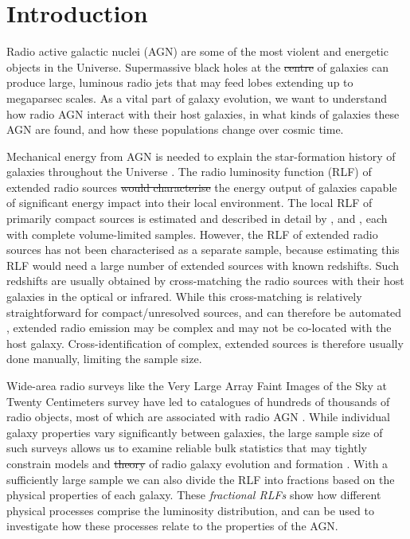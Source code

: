 \documentclass[11pt, a4paper]{book}
\newcommand{\defn}[1]{\emph{#1}}
\providecommand{\DIFaddtex}[1]{{\protect\color{blue}\uwave{#1}}} %
\providecommand{\DIFdeltex}[1]{{\protect\color{red}\sout{#1}}}                      %
\providecommand{\DIFaddbegin}{} %
\providecommand{\DIFaddend}{} %
\providecommand{\DIFdelbegin}{} %
\providecommand{\DIFdelend}{} %
\providecommand{\DIFadd}[1]{\texorpdfstring{\DIFaddtex{#1}}{#1}} %
\providecommand{\DIFdel}[1]{\texorpdfstring{\DIFdeltex{#1}}{}} %
\newcommand{\DIFscaledelfig}{0.5}
\newlength{\DIFdelgraphicswidth} %
\newlength{\DIFdelgraphicsheight} %
\newcommand{\DIFaddincludegraphics}[2][]{{\color{blue}\fbox{\DIFOincludegraphics[#1]{#2}}}} %
\newcommand{\DIFdelincludegraphics}[2][]{%
\sbox{\DIFdelgraphicsbox}{\DIFOincludegraphics[#1]{#2}}%
\settoboxwidth{\DIFdelgraphicswidth}{\DIFdelgraphicsbox} %
\settoboxtotalheight{\DIFdelgraphicsheight}{\DIFdelgraphicsbox} %
\scalebox{\DIFscaledelfig}{%
\parbox[b]{\DIFdelgraphicswidth}{\usebox{\DIFdelgraphicsbox}\\[-\baselineskip] \rule{\DIFdelgraphicswidth}{0em}}\llap{\resizebox{\DIFdelgraphicswidth}{\DIFdelgraphicsheight}{%
\setlength{\unitlength}{\DIFdelgraphicswidth}%
\begin{picture}(1,1)%
\thicklines\linethickness{2pt} %
{\color[rgb]{1,0,0}\put(0,0){\framebox(1,1){}}}%
{\color[rgb]{1,0,0}\put(0,0){\line( 1,1){1}}}%
{\color[rgb]{1,0,0}\put(0,1){\line(1,-1){1}}}%
\end{picture}%
}\hspace*{3pt}}} %
} %
\DeclareRobustCommand{\DIFaddbegin}{\DIFOaddbegin \let\includegraphics\DIFaddincludegraphics} %
\DeclareRobustCommand{\DIFaddend}{\DIFOaddend \let\includegraphics\DIFOincludegraphics} %
\DeclareRobustCommand{\DIFdelbegin}{\DIFOdelbegin \let\includegraphics\DIFdelincludegraphics} %
\DeclareRobustCommand{\DIFdelend}{\DIFOaddend \let\includegraphics\DIFOincludegraphics} %
\begin{document}
\section{Introduction} \label{sec:rlfs-intro}

Radio active galactic nuclei (AGN) are some of the most violent and energetic
objects in the Universe. Supermassive black holes at the \DIFdelbegin \DIFdel{centre }\DIFdelend \DIFaddbegin \DIFadd{centres }\DIFaddend of galaxies
can produce large, luminous radio jets that may feed lobes extending up to
megaparsec scales. As a vital part of galaxy evolution, we want to understand
how radio AGN interact with their host galaxies, in what kinds of galaxies
these AGN are found, and how these populations change over cosmic time.

Mechanical energy from AGN is needed to explain the star-formation history of galaxies throughout the Universe \citep[e.g.][]{raouf17agn,hardcastle20feedback}. The radio luminosity function (RLF) of extended radio sources \DIFdelbegin \DIFdel{would characterise }\DIFdelend \DIFaddbegin \DIFadd{characterises }\DIFaddend the energy output of galaxies capable of significant energy impact into their local environment. The local RLF of primarily compact sources is estimated and
described in detail by \citet{mauch07rlf}, \citet{pracy16rlf} and
\citet{condon19rlf}, each with complete volume-limited samples. However, the RLF of extended radio sources has not been
characterised as a separate sample, because estimating this RLF would need a large number of extended sources with known
redshifts. Such redshifts are usually obtained by cross-matching the radio
sources with their host galaxies in the optical or infrared. While this
cross-matching is relatively straightforward for compact/unresolved sources,
and can therefore be automated \citep[e.g.][]{kimball08}, extended radio
emission may be complex and may not be co-located with the host galaxy.
Cross-identification of complex, extended sources is therefore usually done
manually, limiting the sample size.

Wide-area radio surveys like the Very Large Array Faint Images of the Sky at
Twenty Centimeters survey \citep[FIRST;][]{white97first} have led to
catalogues of hundreds of thousands of radio objects, most of which are
associated with radio AGN \citep{sadler02rlf}. While individual galaxy
properties vary significantly between galaxies, the large sample size of
such surveys allows us to examine reliable bulk statistics that may
tightly constrain models and \DIFdelbegin \DIFdel{theory }\DIFdelend \DIFaddbegin \DIFadd{theories }\DIFaddend of radio galaxy evolution and formation \citep{condon92radio}. With a
sufficiently large sample \citep[of size $N$ such that $N \gg
\sqrt{N}$;][]{condon91rlf} we can also divide the RLF into fractions based
on the physical properties of each galaxy. These \defn{fractional RLFs} show
how different physical processes comprise the luminosity distribution, and
can be used to investigate how these processes relate to the properties of
the AGN.
\end{document}
